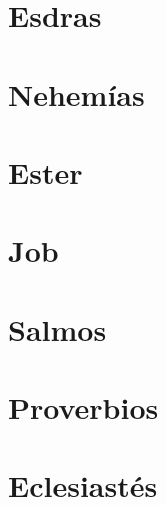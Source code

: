 \chapter{Esdras}
\begin{multicols}{2}
  \raggedcolumns
  \parskip=0pt \relax
  
\end{multicols}

\chapter{Nehemías}
\begin{multicols}{2}
  \raggedcolumns
  \parskip=0pt \relax
  
\end{multicols}

\chapter{Ester}
\begin{multicols}{2}
  \raggedcolumns
  \parskip=0pt \relax
  
\end{multicols}

\chapter{Job}
\begin{multicols}{2}
  \raggedcolumns
  \parskip=0pt \relax
  
\end{multicols}

\chapter{Salmos}
\begin{multicols}{2}
  \raggedcolumns
  \parskip=0pt \relax
  
\end{multicols}

\chapter{Proverbios}
\begin{multicols}{2}
  \raggedcolumns
  \parskip=0pt \relax
  
\end{multicols}

\chapter{Eclesiastés}
\begin{multicols}{2}
  \raggedcolumns
  \parskip=0pt \relax
  
\end{multicols}

